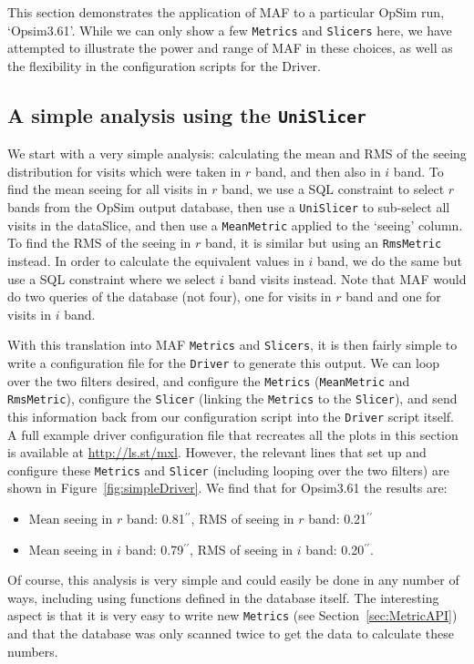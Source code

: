 \documentclass[]{spie}  %
\def\arcsec{$^{\prime\prime}$}
\begin{document}
This section demonstrates the application of MAF to a particular OpSim
run, `Opsim3.61'. While we can only show a few {\tt Metrics} and {\tt Slicers}
here, we have attempted to illustrate the power and range of MAF in
these choices, as well as the flexibility in the configuration scripts
for the Driver.

\subsection{A simple analysis using the {\tt UniSlicer}}

We start with a very simple analysis: calculating
the mean and RMS of the seeing distribution for visits which were
taken in $r$ band, and then also in $i$ band. To find the mean seeing
for all visits in $r$ band, we use a SQL constraint to select
$r$ bands from the OpSim output database, then use a {\tt UniSlicer} to
sub-select all visits in the dataSlice, and then use a {\tt MeanMetric}
applied to the `seeing' column. To find the RMS of the seeing in $r$
band, it is similar but using an {\tt RmsMetric} instead. In order to
calculate the equivalent values in $i$ band, we do the same but use a
SQL constraint where we select $i$ band visits instead. Note that MAF
would do two queries of the database (not four), one for visits in $r$
band and one for visits in $i$ band.

With this translation into MAF {\tt Metrics} and {\tt Slicers}, it is then
fairly simple to write a configuration
file for the {\tt Driver} to generate this output.  We can loop over the two
filters desired, and configure the {\tt Metrics} ({\tt MeanMetric} and {\tt RmsMetric}),
configure the {\tt Slicer} (linking the {\tt Metrics} to the {\tt Slicer}), and send
this information back from our configuration script into the {\tt Driver}
script itself. A full example driver
configuration file that recreates all the plots in this section is
available at {\url {http://ls.st/mxl}}.  However, the relevant lines
that set up and configure these {\tt Metrics} and {\tt Slicer} (including looping
over the two filters) are shown in Figure~\ref{fig:simpleDriver}. We
find that for Opsim3.61 the results are: 
\begin{itemize}
\item{Mean seeing in $r$ band: 0.81\arcsec, RMS of seeing in $r$ band: 0.21\arcsec}
\item{Mean seeing in $i$ band: 0.79\arcsec, RMS of seeing in $i$ band: 0.20\arcsec.}
\end{itemize}
Of course, this analysis is very simple and could easily be done in
any number of ways, including using functions defined in the database
itself. The interesting aspect is that it is very easy to write new
{\tt Metrics} (see Section~\ref{sec:MetricAPI}) and that the database
was only scanned twice to get the data to calculate these numbers.
\end{document}
